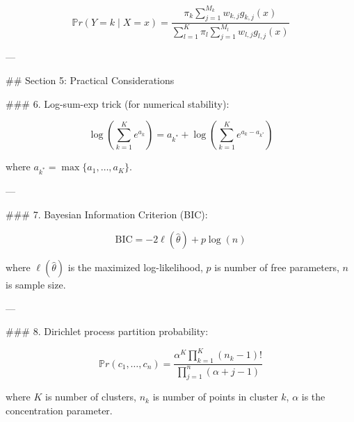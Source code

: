 $$
\mathbb{P}r(Y = k \mid X = x) = \frac{\pi_k \sum_{j=1}^{M_k} w_{k,j} g_{k,j}(x)}{\sum_{l=1}^K \pi_l \sum_{j=1}^{M_l} w_{l,j} g_{l,j}(x)}
$$

---

## Section 5: Practical Considerations

### 6. Log-sum-exp trick (for numerical stability):

$$
\log \left( \sum_{k=1}^K e^{a_k} \right) = a_{k^*} + \log \left( \sum_{k=1}^K e^{a_k - a_{k^*}} \right)
$$

where $a_{k^*} = \max\{a_1, \ldots, a_K\}$.

---

### 7. Bayesian Information Criterion (BIC):

$$
\text{BIC} = -2 \ell(\hat{\theta}) + p \log(n)
$$

where $\ell(\hat{\theta})$ is the maximized log-likelihood, $p$ is number of free parameters, $n$ is sample size.

---

### 8. Dirichlet process partition probability:

$$
\mathbb{P}r(c_1, \ldots, c_n) = \frac{\alpha^K \prod_{k=1}^K (n_k - 1)!}{\prod_{j=1}^n (\alpha + j - 1)}
$$

where $K$ is number of clusters, $n_k$ is number of points in cluster $k$, $\alpha$ is the concentration parameter.


